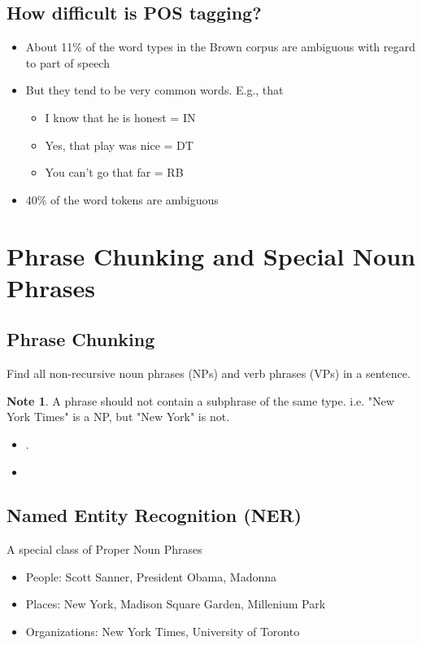 \documentclass[11pt]{article}
\theoremstyle{definition}
\newtheorem{note}{Note}
\begin{document}
\subsection{How difficult is POS tagging?}
\begin{itemize}
  \item About 11\% of the word types in the Brown corpus are
  ambiguous with regard to part of speech
  \item But they tend to be very common words. E.g., that
  \begin{itemize}
    \item I know that he is honest = IN
    \item Yes, that play was nice = DT
    \item You can’t go that far = RB
  \end{itemize}
  \item 40\% of the word tokens are ambiguous
\end{itemize}

\section{Phrase Chunking and
Special Noun Phrases}

\subsection{Phrase Chunking}
Find all non-recursive noun phrases (NPs) and verb
phrases (VPs) in a sentence.

\begin{note}
  A phrase should not contain a subphrase of the same type.
  i.e. "New York Times" is a NP, but "New York" is not.
\end{note}

\begin{itemize}
  \item [] [NP I] [VP ate] [NP the spaghetti] [PP with] [NP meatballs].
  \item [] [NP He] [VP reckons] [NP the current account deficit] [VP will
  narrow] [PP to] [NP only \# 1.8 billion] [PP in] [NP September]
\end{itemize}

\subsection{Named Entity Recognition (NER)}
A special class of Proper Noun Phrases
\begin{itemize}
  \item People: Scott Sanner, President Obama, Madonna
  \item Places: New York, Madison Square Garden, Millenium Park
  \item Organizations: New York Times, University of Toronto
\end{itemize}
\end{document}
